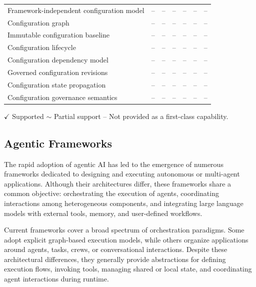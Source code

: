 \documentclass[10pt]{article}
\begin{document}
\begin{table}[t]
\begin{tabular}{p{4.2cm}cccccc}
\midrule

Framework-independent configuration model
                                 & -- & -- & -- & -- & -- & -- \\

Configuration graph              & -- & -- & -- & -- & -- & -- \\

Immutable configuration baseline & -- & -- & -- & -- & -- & -- \\

Configuration lifecycle          & -- & -- & -- & -- & -- & -- \\

Configuration dependency model   & -- & -- & -- & -- & -- & -- \\

Governed configuration revisions & -- & -- & -- & -- & -- & -- \\

Configuration state propagation  & -- & -- & -- & -- & -- & -- \\

Configuration governance semantics
                                 & -- & -- & -- & -- & -- & -- \\

\bottomrule
\end{tabular}

\vspace{1mm}

\footnotesize
$\checkmark$ Supported \hspace{1em}
$\sim$ Partial support \hspace{1em}
-- Not provided as a first-class capability.

\end{table}

\subsection{Agentic Frameworks}
\label{sec:agentic_frameworks}

The rapid adoption of agentic AI has led to the emergence of numerous frameworks dedicated to designing and executing autonomous or multi-agent applications. Although their architectures differ, these frameworks share a common objective: orchestrating the execution of agents, coordinating interactions among heterogeneous components, and integrating large language models with external tools, memory, and user-defined workflows.

Current frameworks cover a broad spectrum of orchestration paradigms. Some adopt explicit graph-based execution models, while others organize applications around agents, tasks, crews, or conversational interactions. Despite these architectural differences, they generally provide abstractions for defining execution flows, invoking tools, managing shared or local state, and coordinating agent interactions during runtime.
\end{document}
